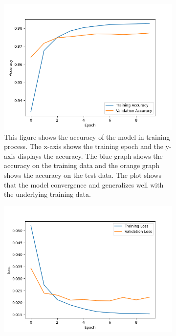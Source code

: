 \begin{figure}[ht!]  
  \centering
  \begin{subfigure}[b]{.47\textwidth}
      \centering
      \includegraphics[width=\linewidth ]{images/Model2Acc.png}
      \caption{This figure shows the accuracy of the model in training process. The x-axis shows the training epoch and the y-axis 
      displays the accuracy. The blue graph shows the accuracy on the training data and the orange graph shows the accuracy on the test data.
    The plot shows that the model convergence and generalizes well with the underlying training data.}
      \label{fig:accM2}
  \end{subfigure}
  \hfill
  \begin{subfigure}[b]{.47\textwidth}
      \centering
      \includegraphics[width=\linewidth, keepaspectratio]{images/M2_Loss_Fin.png}

\end{subfigure}
\end{figure}
